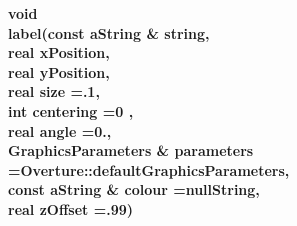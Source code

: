 \begin{flushleft} \textbf{%
void   \\ 
\settowidth{\GLGraphicsInterfaceIncludeArgIndent}{label(}%
label(const aString \& string,     \\ 
\hspace{\GLGraphicsInterfaceIncludeArgIndent}real xPosition, \\ 
\hspace{\GLGraphicsInterfaceIncludeArgIndent}real yPosition,\\ 
\hspace{\GLGraphicsInterfaceIncludeArgIndent}real size =.1,\\ 
\hspace{\GLGraphicsInterfaceIncludeArgIndent}int centering =0 , \\ 
\hspace{\GLGraphicsInterfaceIncludeArgIndent}real angle =0.,\\ 
\hspace{\GLGraphicsInterfaceIncludeArgIndent}GraphicsParameters \& parameters   =Overture::defaultGraphicsParameters,\\ 
\hspace{\GLGraphicsInterfaceIncludeArgIndent}const aString \& colour   =nullString,\\ 
\hspace{\GLGraphicsInterfaceIncludeArgIndent}real zOffset  =.99)
}\end{flushleft}

